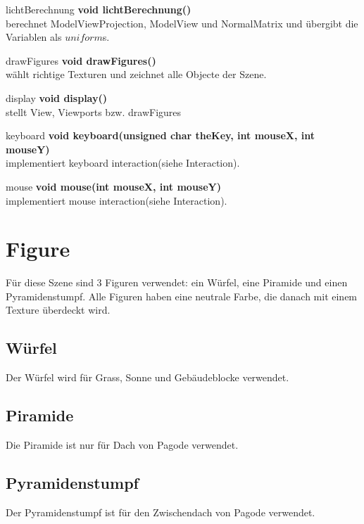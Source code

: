 \documentclass[12pt]{article}
\begin{document}
\begin{mybox}[colback=white]{lichtBerechnung}
\textbf{void lichtBerechnung()} \\
berechnet ModelViewProjection, ModelView und NormalMatrix und übergibt die Variablen als $uniform$s.
\end{mybox}

\begin{mybox}[colback=white]{drawFigures}
\textbf{void drawFigures()} \\
wählt richtige Texturen und zeichnet alle Objecte der Szene.
\end{mybox}

\begin{mybox}[colback=white]{display}
\textbf{void display()} \\
stellt View, Viewports bzw. drawFigures
\end{mybox}

\begin{mybox}[colback=white]{keyboard}
\textbf{void keyboard(unsigned char theKey, int mouseX, int mouseY)} \\
implementiert keyboard interaction(siehe Interaction).
\end{mybox}

\begin{mybox}[colback=white]{mouse}
\textbf{void mouse(int mouseX, int mouseY)} \\
implementiert mouse interaction(siehe Interaction).
\end{mybox}

\pagebreak
\section{Figure}
Für diese Szene sind 3 Figuren verwendet: ein Würfel, eine Piramide und einen Pyramidenstumpf. Alle Figuren haben eine neutrale Farbe, die danach mit einem Texture überdeckt wird. \\
\subsection{Würfel}
Der Würfel wird für Grass, Sonne und Gebäudeblocke verwendet.
\subsection{Piramide}
Die Piramide ist nur für Dach von Pagode verwendet.
\subsection{Pyramidenstumpf}
Der Pyramidenstumpf ist für den Zwischendach von Pagode verwendet.
\end{document}

